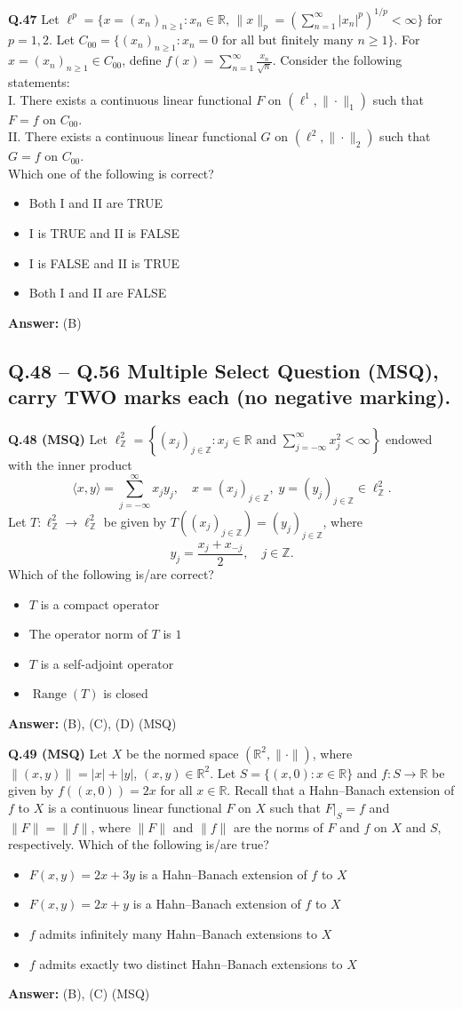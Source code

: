 \documentclass[11pt,a4paper]{article}
\newcommand{\optslistA}[4]{%
  \begin{itemize}
    \setlength{\itemsep}{2pt}\setlength{\parskip}{0pt}
    \item[(A)] #1
    \item[(B)] #2
    \item[(C)] #3
    \item[(D)] #4
  \end{itemize}%
}
\newcommand{\ans}[1]{\textbf{Answer:} #1\par\medskip}
\begin{document}
\textbf{Q.47} Let $\ell^p = \{x = (x_n)_{n \ge 1} : x_n \in \mathbb{R}, \, \|x\|_p = (\sum_{n=1}^{\infty} |x_n|^p)^{1/p} < \infty\}$ for $p = 1, 2$. Let $C_{00} = \{(x_n)_{n \ge 1} : x_n = 0 \text{ for all but finitely many } n \ge 1\}$. For $x = (x_n)_{n \ge 1} \in C_{00}$, define $f(x) = \sum_{n=1}^{\infty} \frac{x_n}{\sqrt{n}}$. Consider the following statements:\\
I. There exists a continuous linear functional $F$ on $(\ell^1, \|\cdot\|_1)$ such that $F = f$ on $C_{00}$.\\
II. There exists a continuous linear functional $G$ on $(\ell^2, \|\cdot\|_2)$ such that $G = f$ on $C_{00}$.\\
Which one of the following is correct?
\optslistA{Both I and II are TRUE}{I is TRUE and II is FALSE}{I is FALSE and II is TRUE}{Both I and II are FALSE}
\ans{(B)}

\subsection*{Q.48 -- Q.56 Multiple Select Question (MSQ), carry TWO marks each (no negative marking).}

\textbf{Q.48 (MSQ)} Let $\ell^2_{\mathbb{Z}} = \left\{(x_j)_{j \in \mathbb{Z}} : x_j \in \mathbb{R} \text{ and } \sum_{j=-\infty}^{\infty} x_j^2 < \infty\right\}$ endowed with the inner product
\[
  \langle x, y \rangle = \sum_{j=-\infty}^{\infty} x_j y_j, \quad x = (x_j)_{j \in \mathbb{Z}}, \; y = (y_j)_{j \in \mathbb{Z}} \in \ell^2_{\mathbb{Z}}.
\]
Let $T : \ell^2_{\mathbb{Z}} \to \ell^2_{\mathbb{Z}}$ be given by $T((x_j)_{j \in \mathbb{Z}}) = (y_j)_{j \in \mathbb{Z}}$, where
\[
  y_j = \frac{x_j + x_{-j}}{2}, \quad j \in \mathbb{Z}.
\]
Which of the following is/are correct?
\optslistA{$T$ is a compact operator}{The operator norm of $T$ is $1$}{$T$ is a self-adjoint operator}{$\operatorname{Range}(T)$ is closed}
\ans{(B), (C), (D) (MSQ)}

\textbf{Q.49 (MSQ)} Let $X$ be the normed space $(\mathbb{R}^2, \|\cdot\|)$, where $\|(x, y)\| = |x| + |y|$, $(x, y) \in \mathbb{R}^2$. Let $S = \{(x, 0) : x \in \mathbb{R}\}$ and $f : S \to \mathbb{R}$ be given by $f((x, 0)) = 2x$ for all $x \in \mathbb{R}$. Recall that a Hahn--Banach extension of $f$ to $X$ is a continuous linear functional $F$ on $X$ such that $F|_S = f$ and $\|F\| = \|f\|$, where $\|F\|$ and $\|f\|$ are the norms of $F$ and $f$ on $X$ and $S$, respectively. Which of the following is/are true?
\optslistA{$F(x, y) = 2x + 3y$ is a Hahn--Banach extension of $f$ to $X$}{$F(x, y) = 2x + y$ is a Hahn--Banach extension of $f$ to $X$}{$f$ admits infinitely many Hahn--Banach extensions to $X$}{$f$ admits exactly two distinct Hahn--Banach extensions to $X$}
\ans{(B), (C) (MSQ)}
\end{document}

